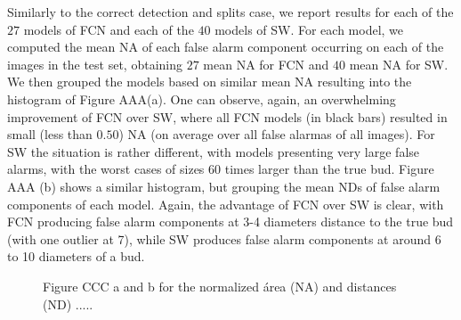 \documentclass[a4paper,authoryear,review]{elsarticle}
\begin{document}
Similarly to the correct detection and splits case, we report results for each of the $27$ models of FCN and each of the $40$ models of SW. For each model, we computed the mean NA of each false alarm component occurring on each of the images in the test set, obtaining $27$ mean NA for FCN and $40$ mean NA for SW. We then grouped the models based on similar mean NA resulting into the histogram of Figure AAA(a). One can observe, again, an overwhelming improvement of FCN over SW, where all FCN models (in black bars) resulted in small (less than $0.50$) NA (on average over all false alarmas of all images). For SW the situation is rather different, with models presenting very large false alarms, with the worst cases of sizes 60 times larger than the true bud. 
Figure AAA (b) shows a similar histogram, but grouping the mean NDs of false alarm components of each model. Again, the advantage of FCN over SW is clear, with FCN producing false alarm components at 3-4 diameters distance to the true bud (with one outlier at 7), while SW produces false alarm components at around 6 to 10 diameters of a bud.

\begin{figure}%
	\centering
	\label{fig:truebud-FA-a}
	\qquad
	\label{fig:truebud-FA-b}
	\caption{Figure CCC a and b for the normalized área (NA) and distances (ND) .....}%
	\label{fig:truebud-FA}%
\end{figure}
\end{document}
